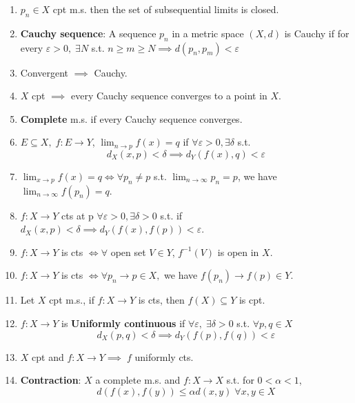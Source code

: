 \documentclass[10pt,landscape]{article}
\begin{document}
\begin{multicols}{3}
\begin{enumerate}
	\item $p_n \in X$ cpt m.s. then the set of subsequential limits is closed.
	
	\item \textbf{Cauchy sequence}: A sequence $p_n$ in a metric space $(X, d)$ is Cauchy if for every $\varepsilon >0, \; \exists N$ s.t. $n\geq m\geq N \implies d(p_n, p_m) < \varepsilon$
	
	\item Convergent $\implies$ Cauchy.
	\item $X$ cpt $\implies$ every Cauchy sequence converges to a point in $X$.
	
	\item \textbf{Complete} m.s. if every Cauchy sequence converges.
	
	\item $E\subseteq X, \; f: E\rightarrow Y$, $\lim_{n\rightarrow p} f(x) = q$ if $\forall \varepsilon>0, \exists \delta$ s.t. 
	$$d_X(x, p) < \delta \implies d_Y(f(x), q ) < \varepsilon$$
	
	\item $\lim_{x\rightarrow p} f(x) = q \iff \forall p_n \neq p$ s.t. $\lim_{n\rightarrow \infty} p_n = p$, we have $\lim_{n\rightarrow \infty} f(p_n) = q$.
	
	\item $f: X\rightarrow Y$ cts at p $\forall \varepsilon> 0, \exists \delta >0$ s.t. if $ d_X(x, p) < \delta \implies d_Y(f(x), f(p)) < \varepsilon$.
	
	\item $f: X\rightarrow Y$ is cts $\iff \forall$ open set $V \in Y$, $f^{-1}(V)$ is open in $X$.
	
	\item $f: X \rightarrow Y$ is cts $\iff \forall p_n \rightarrow p \in X, $ we have $f(p_n) \rightarrow f(p) \in Y$. 
	
	\item Let $X$ cpt m.s., if $f: X \rightarrow Y$ is cts, then $f(X) \subseteq Y$ is cpt.
	
	\item $f:X \rightarrow Y$ is \textbf{Uniformly continuous} if $\forall \varepsilon, \; \exists \delta > 0 $ s.t. $\forall p,q \in X$
		$$d_X( p,q) < \delta \implies d_Y(f(p), f(q)) < \varepsilon $$

	\item $X$ cpt and $f: X \rightarrow Y \implies \; f$ uniformly cts. 
	
	\item \textbf{Contraction}: $X$ a complete m.s. and $f: X\rightarrow X$ s.t. for $0< \alpha< 1 $, 
	$$d(f(x), f(y)) \leq \alpha d(x,y) \; \forall x,y \in X$$
	

\end{enumerate}
\end{multicols}
\end{document}
